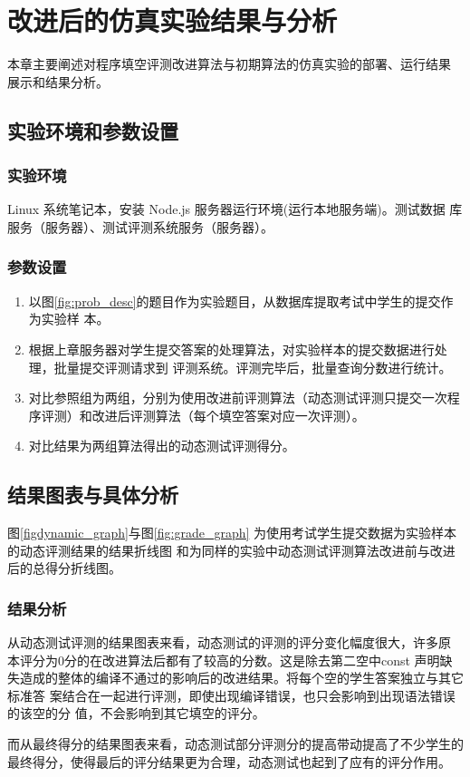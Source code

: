 \chapter{改进后的仿真实验结果与分析}

本章主要阐述对程序填空评测改进算法与初期算法的仿真实验的部署、运行结果
展示和结果分析。

\section{实验环境和参数设置}
\subsection{实验环境}
Linux 系统笔记本，安装 Node.js 服务器运行环境(运行本地服务端)。测试数据
库服务（服务器）、测试评测系统服务（服务器）。

\subsection{参数设置}
\begin{enumerate}
  \item 以图\ref{fig:prob_desc}的题目作为实验题目，从数据库提取考试中学生的提交作为实验样
本。
  \item 根据上章服务器对学生提交答案的处理算法，对实验样本的提交数据进行处理，批量提交评测请求到
  评测系统。评测完毕后，批量查询分数进行统计。
  \item 对比参照组为两组，分别为使用改进前评测算法（动态测试评测只提交一次程序评测）和改进后评测算法（每个填空答案对应一次评测）。
  \item 对比结果为两组算法得出的动态测试评测得分。
\end{enumerate}

\section{结果图表与具体分析}
图\ref{figdynamic_graph}与图\ref{fig:grade_graph}
为使用考试学生提交数据为实验样本的动态评测结果的结果折线图
和为同样的实验中动态测试评测算法改进前与改进后的总得分折线图。



\subsection{结果分析}
从动态测试评测的结果图表来看，动态测试的评测的评分变化幅度很大，许多原
本评分为0分的在改进算法后都有了较高的分数。这是除去第二空中const
声明缺失造成的整体的编译不通过的影响后的改进结果。将每个空的学生答案独立与其它标准答
案结合在一起进行评测，即使出现编译错误，也只会影响到出现语法错误的该空的分
值，不会影响到其它填空的评分。

而从最终得分的结果图表来看，动态测试部分评测分的提高带动提高了不少学生的
最终得分，使得最后的评分结果更为合理，动态测试也起到了应有的评分作用。

\clearpage
